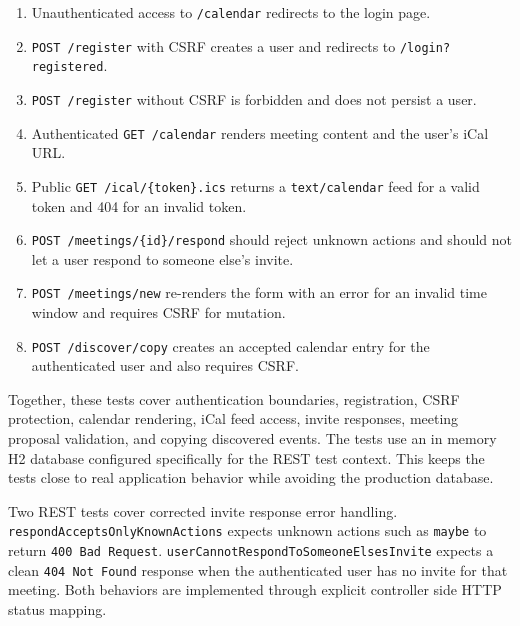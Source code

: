 \begin{enumerate}
\item Unauthenticated access to \texttt{/calendar} redirects to the login page.
\item \texttt{POST /register} with CSRF creates a user and redirects to \texttt{/login?registered}.
\item \texttt{POST /register} without CSRF is forbidden and does not persist a user.
\item Authenticated \texttt{GET /calendar} renders meeting content and the user's iCal URL.
\item Public \texttt{GET /ical/\{token\}.ics} returns a \texttt{text/calendar} feed for a valid token and 404 for an invalid token.
\item \texttt{POST /meetings/\{id\}/respond} should reject unknown actions and should not let a user respond to someone else's invite.
\item \texttt{POST /meetings/new} re-renders the form with an error for an invalid time window and requires CSRF for mutation.
\item \texttt{POST /discover/copy} creates an accepted calendar entry for the authenticated user and also requires CSRF.
\end{enumerate}

Together, these tests cover authentication boundaries, registration, CSRF protection, calendar rendering, iCal feed access, invite responses, meeting proposal validation, and copying discovered events. The tests use an in memory H2 database configured specifically for the REST test context. This keeps the tests close to real application behavior while avoiding the production database.

Two REST tests cover corrected invite response error handling. \texttt{respondAcceptsOnlyKnownActions} expects unknown actions such as \texttt{maybe} to return \texttt{400 Bad Request}. \texttt{userCannotRespondToSomeoneElsesInvite} expects a clean \texttt{404 Not Found} response when the authenticated user has no invite for that meeting. Both behaviors are implemented through explicit controller side HTTP status mapping.
